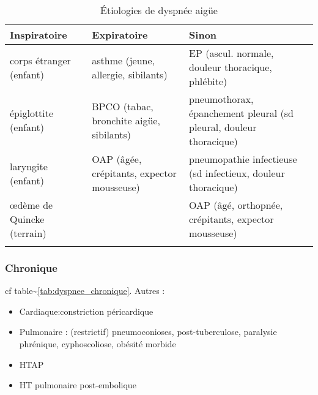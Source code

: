 \documentclass[11pt]{article}
\begin{document}
\begin{table}[htbp]
\caption{Étiologies de dyspnée aigüe}
\label{tab:dyspnee_aigue}
\centering
\begin{adjustbox}{max width=\textwidth}
\begin{tabular}{lll}
\toprule
Inspiratoire & Expiratoire & Sinon\\
\midrule
corps étranger (enfant) & asthme (jeune, allergie, sibilants) & EP
                                                                (ascul. normale,
                                                                douleur
                                                                thoracique, phlébite)\\
épiglottite (enfant) & BPCO (tabac, bronchite aigüe, sibilants) & pneumothorax,
                                                                  épanchement
                                                                  pleural (sd
                                                                  pleural,
                                                                  douleur thoracique)\\
laryngite (enfant) & OAP (âgée, crépitants, expector mousseuse) & pneumopathie
                                                                  infectieuse
                                                                  (sd
                                                                  infectieux,
                                                                  douleur thoracique)\\
\oe{}dème de Quincke (terrain)&  & OAP (âgé, orthopnée, crépitants, expector mousseuse)\\
 &  & \\
\bottomrule
\end{tabular}
\end{adjustbox}
\end{table}

\subsubsection{Chronique}
\label{sec:org824a787}
cf table\textasciitilde{}\ref{tab:dyspnee_chronique}.
Autres :

\begin{itemize}
\item Cardiaque:constriction péricardique
\item Pulmonaire : (restrictif) pneumoconioses, post-tuberculose, paralysie phrénique, cyphoscoliose, obésité morbide
\item HTAP
\item HT pulmonaire post-embolique
\end{itemize}
\end{document}
